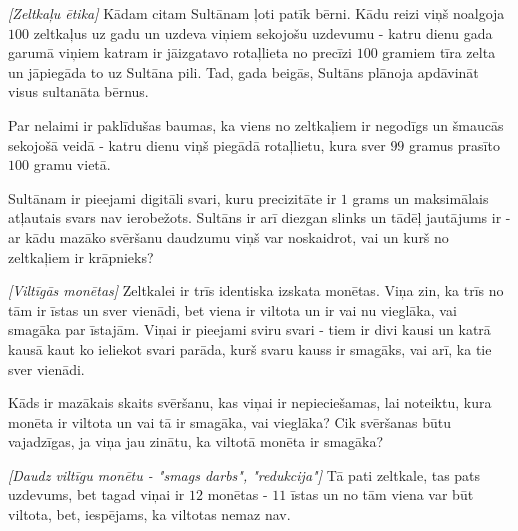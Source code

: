 




\noindent 

\begin{problem}
\textit{[Zeltkaļu ētika]}
Kādam citam Sultānam ļoti patīk bērni. Kādu reizi viņš noalgoja $100$ zeltkaļus uz gadu un uzdeva viņiem sekojošu uzdevumu - katru dienu gada garumā viņiem katram ir jāizgatavo rotaļlieta no precīzi $100$ gramiem tīra zelta un jāpiegāda to uz Sultāna pili. Tad, gada beigās, Sultāns plānoja apdāvināt visus sultanāta bērnus. 

Par nelaimi ir paklīdušas baumas, ka viens no zeltkaļiem ir negodīgs un šmaucās sekojošā veidā - katru dienu viņš piegādā rotaļlietu, kura sver $99$ gramus prasīto $100$ gramu vietā.

Sultānam ir pieejami digitāli svari, kuru precizitāte ir $1$ grams un maksimālais atļautais svars nav ierobežots. Sultāns ir arī diezgan slinks un tādēļ jautājums ir - ar kādu mazāko svēršanu daudzumu viņš var noskaidrot, vai un kurš no zeltkaļiem ir krāpnieks?
\end{problem}
%

\begin{problem}
\textit{[Viltīgās monētas]}
Zeltkalei ir trīs identiska izskata monētas. Viņa zin, ka trīs no tām ir īstas un sver vienādi, bet viena ir viltota un ir vai nu vieglāka, vai smagāka par īstajām. 
Viņai ir pieejami sviru svari - tiem ir divi kausi un katrā kausā kaut ko ieliekot svari parāda, kurš svaru kauss ir smagāks, vai arī, ka tie sver vienādi.

Kāds ir mazākais skaits svēršanu, kas viņai ir nepieciešamas, lai noteiktu, kura monēta ir viltota un vai tā ir smagāka, vai vieglāka? Cik svēršanas būtu vajadzīgas, ja viņa jau zinātu, ka viltotā monēta ir smagāka?

\end{problem}
%

\begin{problem}
\textit{[Daudz viltīgu monētu - "smags darbs", "redukcija"]}
Tā pati zeltkale, tas pats uzdevums, bet tagad viņai ir $12$ monētas - $11$ īstas un no tām viena var būt viltota, bet, iespējams, ka viltotas nemaz nav. 
\end{problem}
%


